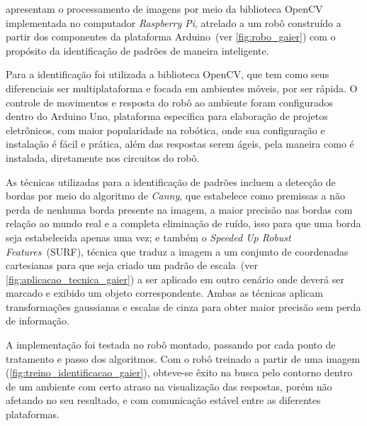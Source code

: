 \documentclass[12pt,oneside,a4paper,chapter=TITLE,section=TITLE,sumario=tradicional]{abntex2}
\begin{document}
 apresentam o processamento de imagens por meio da biblioteca OpenCV implementada no computador \textit{Raspberry Pi}, atrelado a um robô construído a partir dos componentes da plataforma Arduino~(ver \autoref{fig:robo_gaier}) com o propósito da identificação de padrões de maneira inteligente.

\begin{figure}[htb]
\end{figure}

Para a identificação foi utilizada a biblioteca OpenCV, que tem como seus diferenciais ser multiplataforma e focada em ambientes móveis, por ser rápida. O controle de movimentos e resposta do robô ao ambiente foram configurados dentro do Arduino Uno, plataforma específica para elaboração de projetos eletrônicos, com maior popularidade na robótica, onde sua configuração e instalação é fácil e prática, além das respostas serem ágeis, pela maneira como é instalada, diretamente nos circuitos do robô.

As técnicas utilizadas para a identificação de padrões incluem a detecção de bordas por meio do algoritmo de \textit{Canny}, que estabelece como premissas a não perda de nenhuma borda presente na imagem, a maior precisão nas bordas com relação ao mundo real e a completa eliminação de ruído, isso para que uma borda seja estabelecida apenas uma vez; e também o \textit{Speeded Up Robust Features}~(SURF), técnica que traduz a imagem a um conjunto de coordenadas cartesianas para que seja criado um padrão de escala~(ver \autoref{fig:aplicacao_tecnica_gaier}) a ser aplicado em outro cenário onde deverá ser marcado e exibido um objeto correspondente. Ambas as técnicas aplicam transformações gaussianas e escalas de cinza para obter maior precisão sem perda de informação.

\begin{figure}[htb]
\end{figure}

A implementação foi testada no robô montado, passando por cada ponto de tratamento e passo dos algoritmos. Com o robô treinado a partir de uma imagem (\autoref{fig:treino_identificacao_gaier}), obteve-se êxito na busca pelo contorno dentro de um ambiente com certo atraso na visualização das respostas, porém não afetando no seu resultado, e com comunicação estável entre as diferentes plataformas.
\end{document}
